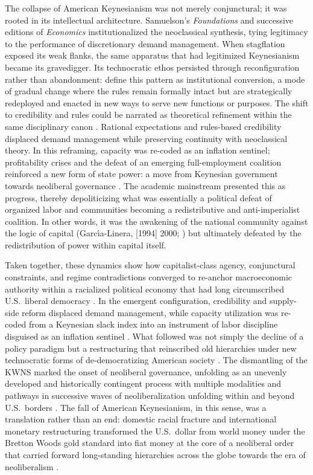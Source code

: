 \documentclass[11pt]{article}
\begin{document}
The collapse of American Keynesianism was not merely conjunctural; it was rooted in its intellectual architecture. Samuelson's \emph{Foundations} \citep{samuelson1947} and successive editions of \emph{Economics} \citep{samuelson1948} institutionalized the neoclassical synthesis, tying legitimacy to the performance of discretionary demand management. When stagflation exposed its weak flanks, the same apparatus that had legitimized Keynesianism became its gravedigger. Its technocratic ethos persisted through reconfiguration rather than abandonment: \citet{mahoneythelen2009} define this pattern as institutional conversion, a mode of gradual change where the rules remain formally intact but are strategically redeployed and enacted in new ways to serve new functions or purposes. The shift to credibility and rules could be narrated as theoretical refinement within the same disciplinary canon \citep{johnson2024}. Rational expectations and rules-based credibility displaced demand management while preserving continuity with neoclassical theory. In this reframing, capacity was re-coded as an inflation sentinel; profitability crises and the defeat of an emerging full-employment coalition reinforced a new form of state power: a move from Keynesian government towards neoliberal governance \citep{jessop2002}. The academic mainstream presented this as progress, thereby depoliticizing what was essentially a political defeat of organized labor and communities becoming a redistributive and anti-imperialist coalition. In other words, it was the awakening of the national community against the logic of capital (Garc{\'\i}a-Linera, [1994] 2000; \citealp{basu2022}) but ultimately defeated by the redistribution of power within capital itself.

Taken together, these dynamics show how capitalist-class agency, conjunctural constraints, and regime contradictions converged to re-anchor macroeconomic authority within a racialized political economy that had long circumscribed U.S.\ liberal democracy \citep{quijano2000,schiller2015}. In the emergent configuration, credibility and supply-side reform displaced demand management, while capacity utilization was re-coded from a Keynesian slack index into an instrument of labor discipline disguised as an inflation sentinel \citep{shaikhetal1999,johnson2024}. What followed was not simply the decline of a policy paradigm but a restructuring that reinscribed old hierarchies under new technocratic forms of de-democratizing American society \citep{gordonedwardsreich1982,kiely2016}. The dismantling of the KWNS marked the onset of neoliberal governance, unfolding as an unevenly developed and historically contingent process with multiple modalities and pathways in successive waves of neoliberalization unfolding within and beyond U.S.\ borders \citep{jessop2002,brenner2002,brennerpecktheodore2010}. The fall of American Keynesianism, in this sense, was a translation rather than an end: domestic racial fracture and international monetary restructuring transformed the U.S.\ dollar from world money under the Bretton Woods gold standard into fiat money at the core of a neoliberal order that carried forward long-standing hierarchies across the globe towards the era of neoliberalism \citep{harvey2007}.
\end{document}
